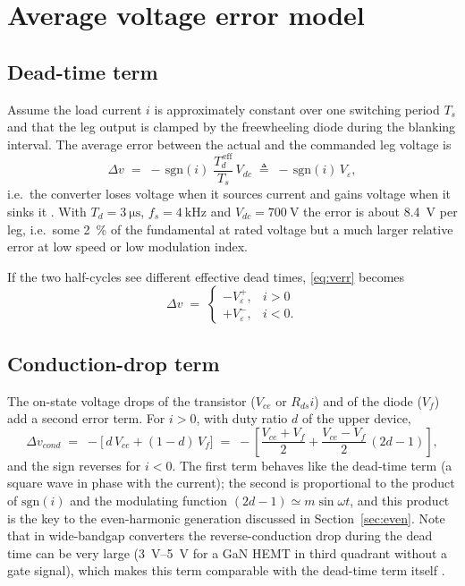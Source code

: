 \documentclass[11pt,a4paper]{article}
\begin{document}
\section{Average voltage error model}

\subsection{Dead-time term}

Assume the load current $i$ is approximately constant over one switching period $T_s$ and
that the leg output is clamped by the freewheeling diode during the blanking interval.
The average error between the actual and the commanded leg voltage is
\begin{equation}
\Delta v \;=\; -\,\mathrm{sgn}(i)\;\frac{T_{d}^{\,\mathrm{eff}}}{T_s}\,V_{dc}
\;\triangleq\; -\,\mathrm{sgn}(i)\,V_{\!\varepsilon} ,
\label{eq:verr}
\end{equation}
i.e.\ the converter loses voltage when it sources current and gains voltage when it sinks
it \cite{jeong1991,choi1996,munoz1999}. With $T_d = \SI{3}{\micro\second}$,
$f_s = \SI{4}{\kilo\hertz}$ and $V_{dc} = \SI{700}{\volt}$ the error is about
\SI{8.4}{\volt} per leg, i.e.\ some \SI{2}{\percent} of the fundamental at rated voltage
but a much larger relative error at low speed or low modulation index.

If the two half-cycles see different effective dead times, \eqref{eq:verr} becomes
\begin{equation}
\Delta v \;=\;
\begin{cases}
-V_{\!\varepsilon}^{+}, & i>0\\[2pt]
+V_{\!\varepsilon}^{-}, & i<0 .
\end{cases}
\label{eq:verrasym}
\end{equation}

\subsection{Conduction-drop term}

The on-state voltage drops of the transistor ($V_{ce}$ or $R_{ds}i$) and of the diode
($V_{f}$) add a second error term. For $i>0$, with duty ratio $d$ of the upper device,
\begin{equation}
\Delta v_{cond} \;=\; -\Big[\,d\,V_{ce} + (1-d)\,V_{f}\Big]
\;=\; -\left[\frac{V_{ce}+V_{f}}{2} + \frac{V_{ce}-V_{f}}{2}\,(2d-1)\right],
\label{eq:vcond}
\end{equation}
and the sign reverses for $i<0$. The first term behaves like the dead-time term (a square
wave in phase with the current); the second is proportional to the product of
$\mathrm{sgn}(i)$ and the modulating function $(2d-1)\simeq m\sin\omega t$, and this
product is the key to the even-harmonic generation discussed in
Section~\ref{sec:even}. Note that in wide-bandgap converters the reverse-conduction drop
during the dead time can be very large (\SIrange{3}{5}{\volt} for a GaN HEMT in third
quadrant without a gate signal), which makes this term comparable with the dead-time term
itself \cite{lidow2019,zhang2015}.
\end{document}
